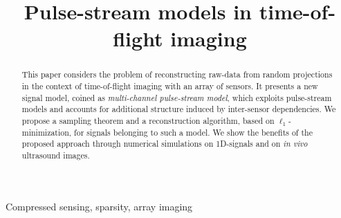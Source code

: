 \documentclass{article}
\theoremstyle{definition}
\begin{document}
\ninept
%
\title{Pulse-stream models in time-of-flight imaging}
%
%

\maketitle

\begin{abstract}
	This paper considers the problem of reconstructing raw-data from random projections in the context of time-of-flight imaging with an array of sensors. It presents a new signal model, coined as \textit{multi-channel pulse-stream model}, which exploits pulse-stream models and accounts for additional structure induced by inter-sensor dependencies. We propose a sampling theorem and a reconstruction algorithm, based on $\ell_1$-minimization, for signals belonging to such a model. We show the benefits of the proposed approach through numerical simulations on \num{1}D-signals and on \textit{in vivo} ultrasound images. 
\end{abstract}

\begin{keywords}
Compressed sensing, sparsity, array imaging
\end{keywords}






%
\maketitle
\end{document}
